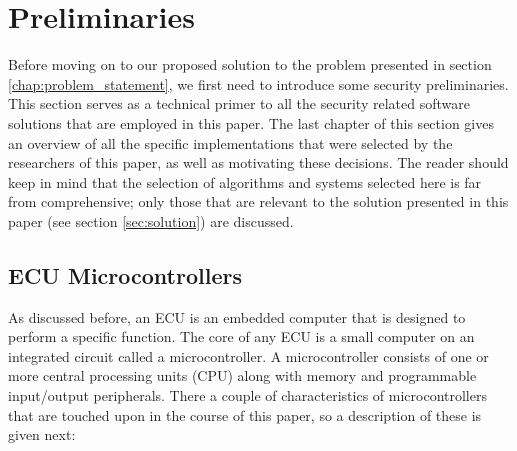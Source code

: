 \chapter{Preliminaries}
\label{chap:preliminaries}

Before moving on to our proposed solution to the problem presented in section \ref{chap:problem_statement}, we first need to introduce some security preliminaries. This section serves as a technical primer to all the security related software solutions that are employed in this paper. The last chapter of this section gives an overview of all the specific implementations that were selected by the researchers of this paper, as well as motivating these decisions. The reader should keep in mind that the selection of algorithms and systems selected here is far from comprehensive; only those that are relevant to the solution presented in this paper (see section \ref{sec:solution}) are discussed. 

\section{ECU Microcontrollers}
\label{sec:microcontrollers}

As discussed before, an ECU is an embedded computer that is designed to perform a specific function. The core of any ECU is a small computer on an integrated circuit called a microcontroller. A microcontroller consists of one or more central processing units (CPU) along with memory and programmable input/output peripherals. There a couple of characteristics of microcontrollers that are touched upon in the course of this paper, so a description of these is given next:

